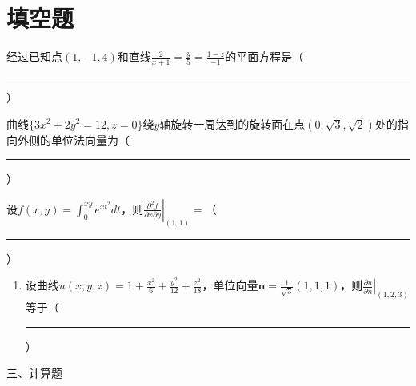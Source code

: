 \documentclass[quiet]{ctexart}
\begin{document}
\section{填空题}

\begin{problem}
  经过已知点$(1,-1,4)$和直线$\frac{2}{x+1}=\frac{y}{5}=\frac{1-z}{-1}$的平面方程是（\rule{3cm}{0.15mm}）
\end{problem}

\begin{problem}
  曲线$\{3x^{2} + 2y^{2} = 12,z=0\}$绕$y$轴旋转一周达到的旋转面在点$(0,\sqrt{3},\sqrt{2})$处的指向外侧的单位法向量为（\rule{3cm}{0.15mm}）
\end{problem}

\begin{problem}
  设$f(x,y) = \int_{0}^{xy}e^{xt^{2}}dt$，则$\left.\frac{\partial^2 f}{\partial x \partial y}\right|_{(1,1)}=$（\rule{3cm}{0.15mm}）
\end{problem}

\begin{problem}
  
\end{problem}

\begin{enumerate}

    \item[14.] 设曲线$u(x,y,z)=1+\frac{x^2}{6}+\frac{y^2}{12}+\frac{z^2}{18}$，单位向量$\mathbf{n}=\frac{1}{\sqrt{3}}(1,1,1)$，则$\left.\frac{\partial u}{\partial n}\right|_{(1,2,3)}$等于（\rule{3cm}{0.15mm}）
\end{enumerate}

三、计算题
\end{document}
